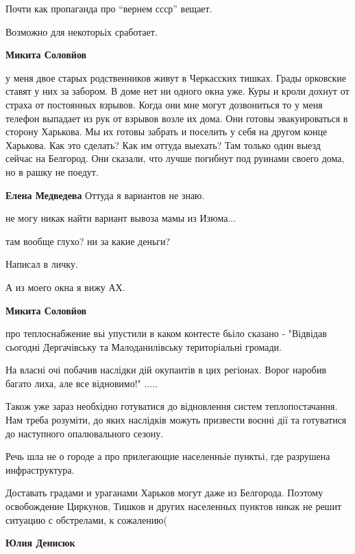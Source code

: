 \begin{itemize}
\begin{itemize}
Почти как пропаганда про \enquote{вернем ссср} вещает.

Возможно для некоторьіх сработает.

\textbf{Микита Соловйов} 

у меня двое старых родственников живут в Черкасских тишках. Грады орковские
ставят у них за забором. В доме нет ни одного окна уже. Куры и кроли дохнут от
страха от постоянных взрывов. Когда они мне могут дозвониться то у меня телефон
выпадает из рук от взрывов возле их дома. Они готовы эвакуироваться в сторону
Харькова. Мы их готовы забрать и поселить у себя на другом конце Харькова. Как
это сделать? Как им оттуда выехать? Там только один выезд сейчас на Белгород.
Они сказали, что лучше погибнут под руинами своего дома, но в рашку не поедут.

\textbf{Елена Медведева} Оттуда я вариантов не знаю.


\end{itemize} %


не могу никак найти вариант вывоза мамы из Изюма...

там вообще глухо? ни за какие деньги?

Написал в личку.

А из моего окна я вижу АХ.

\textbf{Микита Соловйов} 

про теплоснабжение вьі упустили в каком контесте бьіло сказано - "Відвідав
сьогодні Дергачівську та Малоданилівську територіальні громади.

На власні очі побачив наслідки дій окупантів в цих регіонах. Ворог наробив
багато лиха, але все відновимо!" .....

Також уже зараз необхідно готуватися до відновлення систем теплопостачання. Нам
треба розуміти, до яких наслідків можуть призвести воєнні дії та готуватися до
наступного опалювального сезону.

Речь шла не о городе а про прилегающие населенньіе пунктьі, где разрушена
инфраструктура.


Доставать градами и ураганами Харьков могут даже из Белгорода. Поэтому
освобождение Циркунов, Тишков и других населенных пунктов никак не решит
ситуацию с обстрелами, к сожалению(

\begin{itemize} %
\textbf{Юлия Денисюк} 


\end{itemize}
\end{itemize}
